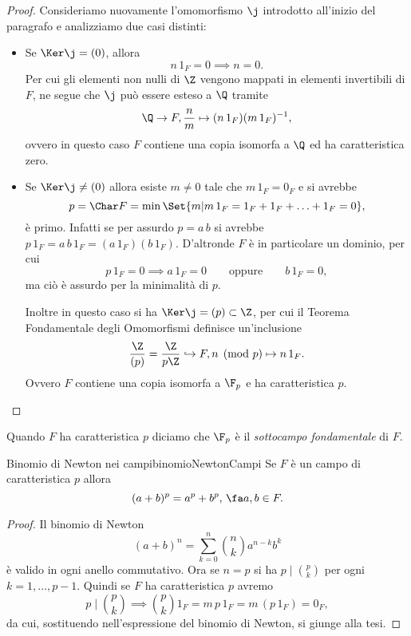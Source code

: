 \begin{proof}
	Consideriamo nuovamente l'omomorfismo \(\j\) introdotto all'inizio del paragrafo e analizziamo due casi distinti:
	\begin{itemize}
		\item Se \(\Ker \j=(0)\), allora
		      \[
			      n\,1_F = 0 \implies n = 0.
		      \]
		      Per cui gli elementi non nulli di \(\Z\) vengono mappati in elementi invertibili di \(F\), ne segue che \(\j\) può essere esteso a \(\Q\) tramite
		      \[
			      \Q \to F, \frac{n}{m} \mapsto (n\,1_F)(m\,1_F)^{-1},
		      \]
		      ovvero in questo caso \(F\) contiene una copia isomorfa a \(\Q\) ed ha caratteristica zero.
		\item Se \(\Ker \j \neq (0)\) allora esiste \(m\neq 0\) tale che \(m\,1_F = 0_F\) e si avrebbe
		      \[
			      p = \Char F = \min\Set{m | m\,1_F = 1_F+1_F + \ldots +1_F =0},
		      \]
		      è primo.
		      Infatti se per assurdo \(p=a\,b\) si avrebbe \(p\,1_F = a\,b\,1_F = (a\,1_F)(b\,1_F)\).
		      D'altronde \(F\) è in particolare un dominio, per cui
		      \[
			      p\,1_F = 0 \implies a\,1_F = 0 \qquad\text{oppure}\qquad b\,1_F = 0,
		      \]
		      ma ciò è assurdo per la minimalità di \(p\).

		      Inoltre in questo caso si ha \(\Ker \j = (p)\subset\Z\), per cui il Teorema Fondamentale degli Omomorfismi definisce un'inclusione
		      \[
			      \frac{\Z}{(p)} = \frac{\Z}{p\Z} \hookrightarrow F, n \pmod{p} \mapsto n\,1_F.
		      \]
		      Ovvero \(F\) contiene una copia isomorfa a \(\F_p\) e ha caratteristica \(p\).
	\end{itemize}
\end{proof}

\begin{notz}
	Quando \(F\) ha caratteristica \(p\) diciamo che \(\F_p\) è il \emph{sottocampo fondamentale} di \(F\).
\end{notz}

\begin{prop}{Binomio di Newton nei campi}{binomioNewtonCampi}
	Se \(F\) è un campo di caratteristica \(p\) allora
	\[
		(a+b)^p = a^p+b^p,\,\fa a,b\in F.
	\]
\end{prop}

\begin{proof}
	Il binomio di Newton
	\[
		(a+b)^n = \sum_{k=0}^{n} \binom{n}{k} a^{n-k}b^k
	\]
	è valido in ogni anello commutativo. Ora se \(n=p\) si ha \(p\mid \binom{p}{k}\) per ogni \(k=1,\ldots,p-1\).
	Quindi se \(F\) ha caratteristica \(p\) avremo
	\[
		p \mid \binom{p}{k} \implies \binom{p}{k} 1_F = m\,p\,1_F = m\,(p\,1_F) = 0_F,
	\]
	da cui, sostituendo nell'espressione del binomio di Newton, si giunge alla tesi.
\end{proof}

